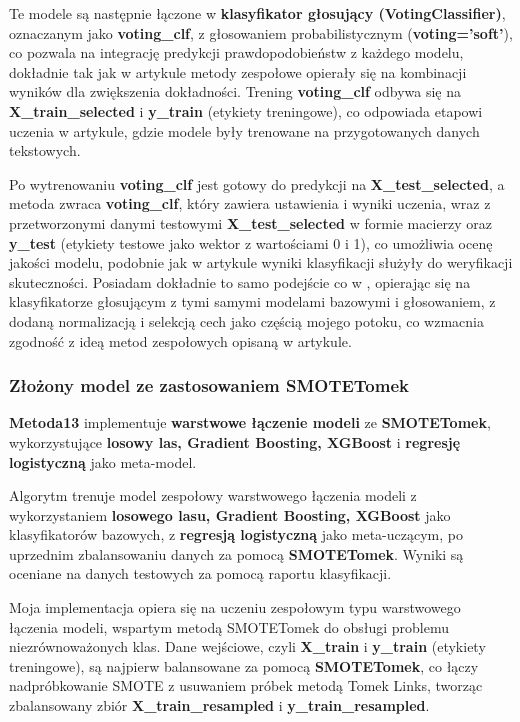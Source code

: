 Te modele są następnie łączone w \textbf{klasyfikator głosujący (VotingClassifier)}, oznaczanym jako \textbf{voting\_clf}, z głosowaniem probabilistycznym (\textbf{voting='soft'}), co pozwala na integrację predykcji prawdopodobieństw z każdego modelu, dokładnie tak jak w artykule metody zespołowe opierały się na kombinacji wyników dla zwiększenia dokładności. Trening \textbf{voting\_clf} odbywa się na \textbf{X\_train\_selected} i \textbf{y\_train} (etykiety treningowe), co odpowiada etapowi uczenia w artykule, gdzie modele były trenowane na przygotowanych danych tekstowych.

Po wytrenowaniu \textbf{voting\_clf} jest gotowy do predykcji na \textbf{X\_test\_selected}, a metoda zwraca \textbf{voting\_clf}, który zawiera ustawienia i wyniki uczenia, wraz z przetworzonymi danymi testowymi \textbf{X\_test\_selected} w formie macierzy oraz \textbf{y\_test} (etykiety testowe jako wektor z wartościami 0 i 1), co umożliwia ocenę jakości modelu, podobnie jak w artykule wyniki klasyfikacji służyły do weryfikacji skuteczności. Posiadam dokładnie to samo podejście co w \cite{metoda11}, opierając się na klasyfikatorze głosującym z tymi samymi modelami bazowymi i głosowaniem, z dodaną normalizacją i selekcją cech jako częścią mojego potoku, co wzmacnia zgodność z ideą metod zespołowych opisaną w artykule.

\subsubsection{Złożony model ze zastosowaniem SMOTETomek}
\textbf{Metoda13} implementuje \textbf{warstwowe łączenie modeli} ze \textbf{SMOTETomek}, wykorzystujące \textbf{losowy las, Gradient Boosting, XGBoost} i \textbf{regresję logistyczną} jako meta-model.

Algorytm trenuje model zespołowy warstwowego łączenia modeli z wykorzystaniem \textbf{losowego lasu, Gradient Boosting, XGBoost} jako klasyfikatorów bazowych, z \textbf{regresją logistyczną} jako meta-uczącym, po uprzednim zbalansowaniu danych za pomocą \textbf{SMOTETomek}. Wyniki są oceniane na danych testowych za pomocą raportu klasyfikacji.

Moja implementacja opiera się na uczeniu zespołowym typu warstwowego łączenia modeli, wspartym metodą SMOTETomek do obsługi problemu niezrównoważonych klas. Dane wejściowe, czyli \textbf{X\_train} i \textbf{y\_train} (etykiety treningowe), są najpierw balansowane za pomocą \textbf{SMOTETomek}, co łączy nadpróbkowanie SMOTE z usuwaniem próbek metodą Tomek Links, tworząc zbalansowany zbiór \textbf{X\_train\_resampled} i \newline\textbf{y\_train\_resampled}.

